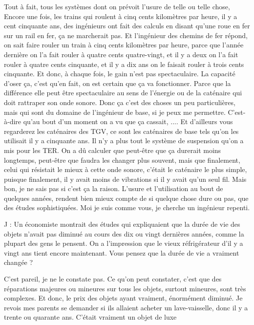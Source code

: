 \begin{description}
Tout à fait, tous les systèmes dont on prévoit l'usure de telle ou telle chose, 
Encore une fois, les trains qui roulent à cinq cents kilomètres par heure, il y a cent cinquante ans, des ingénieurs ont fait des calculs en disant qu’une roue en fer sur un rail en fer, ça ne marcherait pas. Et l'ingénieur des chemins de fer répond, on sait faire rouler un train à cinq cents kilomètres par heure, parce que l'année dernière on l'a fait rouler à quatre cents quatre-vingt, et il y a deux on l'a fait rouler à quatre cents cinquante, et il y a dix ans on le faisait rouler à trois cents cinquante. Et donc, à chaque fois, le gain n'est pas spectaculaire. La capacité d'oser ça, c'est qu'en fait, on est certain que ça va fonctionner. Parce que la différence elle peut être spectaculaire au sens de l'énergie ou de la caténaire qui doit rattraper son onde sonore. Donc ça c'est des choses un peu particulières, mais qui sont du domaine de l'ingénieur de base, si je peux me permettre. C'est-à-dire qu'au bout d'un moment on a vu que ça cassait, .... Et d'ailleurs vous regarderez les caténaires des TGV, ce sont les caténaires de base tels qu'on les utilisait il y a cinquante ans. Il n'y a plus tout le système de suspension qu'on a mis pour les TER. On a dû calculer que peut-être que ça durerait moins longtemps, peut-être que faudra les changer plus souvent, mais que finalement, celui qui résistait le mieux à cette onde sonore, c'était le caténaire le plus simple, puisque finalement, il y avait moins de vibrations si il y avait qu'un seul fil. Mais bon, je ne sais pas si c'est ça la raison. L'usure et l'utilisation au bout de quelques années, rendent bien mieux compte de si quelque chose dure ou pas, que des études sophistiquées.
Moi je suis comme vous, je cherche un ingénieur repenti. 

\vspace{1\baselineskip}

J : Un économiste montrait des études qui expliquaient que la durée de vie des objets n'avait pas diminué au cours des dix ou vingt dernières années, comme la plupart des gens le pensent. On a l'impression que le vieux réfrigérateur d'il y a vingt ans tient encore maintenant. 
Vous pensez que la durée de vie a vraiment changée ?

\vspace{1\baselineskip}

C'est pareil, je ne le constate pas. Ce qu'on peut constater, c'est que des réparations majeures ou mineures sur tous les objets, surtout mineures, sont très complexes. Et donc, le prix des objets ayant vraiment, énormément diminué. Je revois mes parents se demander si ils allaient acheter un lave-vaisselle, donc il y a trente ou quarante ans. C'était vraiment un objet de luxe


\end{description}
